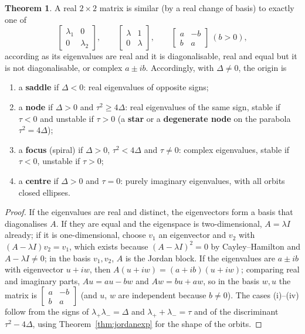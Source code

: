 \documentclass[11pt,a4paper]{article}
\numberwithin{equation}{section}
\theoremstyle{definition}
\newtheorem{thm}{Theorem}[subsection]
\begin{document}
\begin{thm}
\label{thm:planar}
A real $2 \times 2$ matrix is similar (by a real change of basis) to exactly one of
\[
\begin{bmatrix} \lambda_1 & 0\\ 0 & \lambda_2\end{bmatrix}, \qquad \begin{bmatrix} \lambda & 1\\ 0 & \lambda\end{bmatrix}, \qquad \begin{bmatrix} a & -b\\ b & a\end{bmatrix} \ (b > 0),
\]
according as its eigenvalues are real and it is diagonalisable, real and equal but it is not diagonalisable, or complex $a \pm ib$. Accordingly, with $\Delta \neq 0$, the origin is
\begin{enumerate}[label=(\roman*)]
\item a \textbf{saddle} if $\Delta < 0$: real eigenvalues of opposite signs;
\item a \textbf{node} if $\Delta > 0$ and $\tau^2 \geq 4\Delta$: real eigenvalues of the same sign, stable if $\tau < 0$ and unstable if $\tau > 0$ (a \textbf{star} or a \textbf{degenerate node} on the parabola
$\tau^2 = 4\Delta$);
\item a \textbf{focus} (spiral) if $\Delta > 0$, $\tau^2 < 4\Delta$ and $\tau \neq 0$: complex eigenvalues, stable if $\tau < 0$, unstable if $\tau > 0$;
\item a \textbf{centre} if $\Delta > 0$ and $\tau = 0$: purely imaginary eigenvalues, with all orbits closed ellipses.
\end{enumerate}
\end{thm}

\begin{proof}
If the eigenvalues are real and distinct, the eigenvectors form a basis that diagonalises $A$. If they are equal and the eigenspace is two-dimensional, $A = \lambda I$ already;
if it is one-dimensional, choose $v_1$ an eigenvector and $v_2$ with $(A - \lambda I)v_2 = v_1$, which exists because $(A - \lambda I)^2 = 0$ by Cayley--Hamilton and $A - \lambda I \neq 0$; in the basis
$v_1, v_2$, $A$ is the Jordan block. If the eigenvalues are $a \pm ib$ with eigenvector $u + iw$, then $A(u + iw) = (a + ib)(u + iw)$; comparing real and imaginary parts, $Au = au - bw$ and $Aw = bu + aw$, so
in the basis $w, u$ the matrix is $\begin{bmatrix} a & -b\\ b & a\end{bmatrix}$ (and $u$, $w$ are independent because $b \neq 0$). The cases (i)--(iv) follow from the signs of $\lambda_+\lambda_- = \Delta$ and $\lambda_+ + \lambda_- = \tau$ and of the
discriminant $\tau^2 - 4\Delta$, using Theorem~\ref{thm:jordanexp} for the shape of the orbits.
\end{proof}
\end{document}
